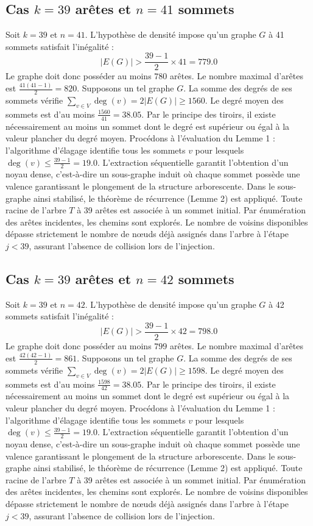 \documentclass[12pt,a4paper]{article}
\begin{document}
\subsection{Cas $k = 39$ arêtes et $n = 41$ sommets}
Soit $k = 39$ et $n = 41$. L'hypothèse de densité impose qu'un graphe $G$ à 41 sommets satisfait l'inégalité :
$$ |E(G)| > \frac{39-1}{2} \times 41 = 779.0 $$
Le graphe doit donc posséder au moins $780$ arêtes. Le nombre maximal d'arêtes est $\frac{41(41-1)}{2} = 820$.
Supposons un tel graphe $G$. La somme des degrés de ses sommets vérifie $\sum_{v \in V} \deg(v) = 2|E(G)| \geq 1560$.
Le degré moyen des sommets est d'au moins $\frac{1560}{41} = 38.05$.
Par le principe des tiroirs, il existe nécessairement au moins un sommet dont le degré est supérieur ou égal à la valeur plancher du degré moyen.
Procédons à l'évaluation du Lemme 1 : l'algorithme d'élagage identifie tous les sommets $v$ pour lesquels $\deg(v) \leq \frac{39-1}{2} = 19.0$.
L'extraction séquentielle garantit l'obtention d'un noyau dense, c'est-à-dire un sous-graphe induit où chaque sommet possède une valence garantissant le plongement de la structure arborescente.
Dans le sous-graphe ainsi stabilisé, le théorème de récurrence (Lemme 2) est appliqué. Toute racine de l'arbre $T$ à 39 arêtes est associée à un sommet initial. Par énumération des arêtes incidentes, les chemins sont explorés. Le nombre de voisins disponibles dépasse strictement le nombre de nœuds déjà assignés dans l'arbre à l'étape $j < 39$, assurant l'absence de collision lors de l'injection.

\subsection{Cas $k = 39$ arêtes et $n = 42$ sommets}
Soit $k = 39$ et $n = 42$. L'hypothèse de densité impose qu'un graphe $G$ à 42 sommets satisfait l'inégalité :
$$ |E(G)| > \frac{39-1}{2} \times 42 = 798.0 $$
Le graphe doit donc posséder au moins $799$ arêtes. Le nombre maximal d'arêtes est $\frac{42(42-1)}{2} = 861$.
Supposons un tel graphe $G$. La somme des degrés de ses sommets vérifie $\sum_{v \in V} \deg(v) = 2|E(G)| \geq 1598$.
Le degré moyen des sommets est d'au moins $\frac{1598}{42} = 38.05$.
Par le principe des tiroirs, il existe nécessairement au moins un sommet dont le degré est supérieur ou égal à la valeur plancher du degré moyen.
Procédons à l'évaluation du Lemme 1 : l'algorithme d'élagage identifie tous les sommets $v$ pour lesquels $\deg(v) \leq \frac{39-1}{2} = 19.0$.
L'extraction séquentielle garantit l'obtention d'un noyau dense, c'est-à-dire un sous-graphe induit où chaque sommet possède une valence garantissant le plongement de la structure arborescente.
Dans le sous-graphe ainsi stabilisé, le théorème de récurrence (Lemme 2) est appliqué. Toute racine de l'arbre $T$ à 39 arêtes est associée à un sommet initial. Par énumération des arêtes incidentes, les chemins sont explorés. Le nombre de voisins disponibles dépasse strictement le nombre de nœuds déjà assignés dans l'arbre à l'étape $j < 39$, assurant l'absence de collision lors de l'injection.
\end{document}
